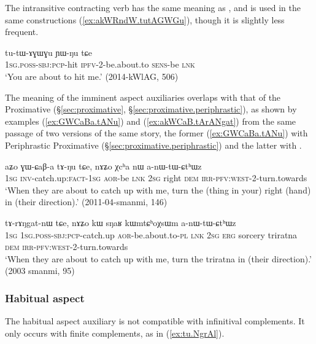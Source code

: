 The intransitive contracting verb  has the same meaning as , and is used in the same constructions (\ref{ex:akWRndW.tutAGWGu}), though it is slightly less frequent.

\begin{exe}
\ex \label{ex:akWRndW.tutAGWGu}
 \gll [a-kɯ-ʁndɯ] tu-tɯ-ɤɣɯɣu ɲɯ-ŋu tɕe \\
\textsc{1sg}.\textsc{poss}-\textsc{sbj}:\textsc{pcp}-hit \textsc{ipfv}-2-be.about.to \textsc{sens}-be \textsc{lnk} \\
\glt `You are about to hit me.' (2014-kWlAG, 506)
\end{exe}

The meaning of the imminent aspect auxiliaries overlaps with that of the Proximative (§\ref{sec:proximative}, §\ref{sec:proximative.periphrastic}), as shown by examples (\ref{ex:GWCaBa.tANu}) and (\ref{ex:akWCaB.tArANgat}) from the same passage of two versions of the same story, the former (\ref{ex:GWCaBa.tANu}) with Periphrastic Proximative (§\ref{sec:proximative.periphrastic}) and the latter with .


\begin{exe}
\ex \label{ex:GWCaBa.tANu}
 \gll aʑo ɣɯ-ɕaβ-a tɤ-ŋu tɕe, nɤʑo χcʰa nɯ a-nɯ-tɯ-ɕtʰɯz \\
 \textsc{1sg} \textsc{inv}-catch.up:\textsc{fact}-\textsc{1sg} \textsc{aor}-be \textsc{lnk} \textsc{2sg} right \textsc{dem} \textsc{irr}-\textsc{pfv}:\textsc{west}-2-turn.towards \\
 \glt `When they are about to catch up with me, turn the (thing in your) right (hand) in (their direction).' (2011-04-smanmi, 146)
\end{exe}

\begin{exe}
\ex \label{ex:akWCaB.tArANgat}
  tɤ-rɤŋgat-nɯ tɕe, nɤʑo kɯ sŋaʁ kɯmtɕʰoχsɯm a-nɯ-tɯ-ɕtʰɯz \\
 \textsc{1sg} \textsc{1sg}.\textsc{poss}-\textsc{sbj}:\textsc{pcp}-catch.up \textsc{aor}-be.about.to-\textsc{pl} \textsc{lnk}  \textsc{2sg} \textsc{erg} sorcery triratna \textsc{dem} \textsc{irr}-\textsc{pfv}:\textsc{west}-2-turn.towards \\
 \glt `When they are about to catch up with me, turn the triratna in (their direction).' (2003 smanmi, 95)
\end{exe}



\subsubsection{Habitual aspect} \label{sec:NgrAl}
The habitual aspect auxiliary  is not compatible with infinitival complements. It only occurs with finite complements, as in (\ref{ex:tu.NgrAl}).

